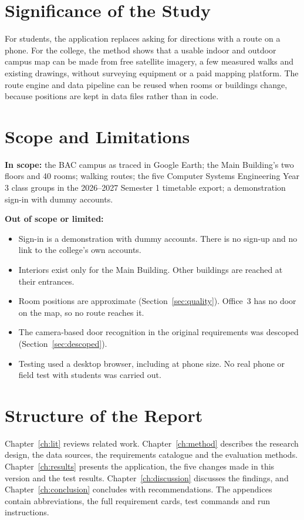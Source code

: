 \documentclass[12pt,a4paper]{report}
\begin{document}
\section{Significance of the Study}
For students, the application replaces asking for directions with a route on a phone. For the college, the method shows that a usable indoor and outdoor campus map can be made from free satellite imagery, a few measured walks and existing drawings, without surveying equipment or a paid mapping platform. The route engine and data pipeline can be reused when rooms or buildings change, because positions are kept in data files rather than in code.

\section{Scope and Limitations}
\textbf{In scope:} the BAC campus as traced in Google Earth; the Main Building's two floors and 40 rooms; walking routes; the five Computer Systems Engineering Year 3 class groups in the 2026--2027 Semester 1 timetable export; a demonstration sign-in with dummy accounts.

\textbf{Out of scope or limited:}
\begin{itemize}
  \item Sign-in is a demonstration with dummy accounts. There is no sign-up and no link to the college's own accounts.
  \item Interiors exist only for the Main Building. Other buildings are reached at their entrances.
  \item Room positions are approximate (Section~\ref{sec:quality}). Office~3 has no door on the map, so no route reaches it.
  \item The camera-based door recognition in the original requirements was descoped (Section~\ref{sec:descoped}).
  \item Testing used a desktop browser, including at phone size. No real phone or field test with students was carried out.
\end{itemize}

\section{Structure of the Report}
Chapter~\ref{ch:lit} reviews related work. Chapter~\ref{ch:method} describes the research design, the data sources, the requirements catalogue and the evaluation methods. Chapter~\ref{ch:results} presents the application, the five changes made in this version and the test results. Chapter~\ref{ch:discussion} discusses the findings, and Chapter~\ref{ch:conclusion} concludes with recommendations. The appendices contain abbreviations, the full requirement cards, test commands and run instructions.
\end{document}
